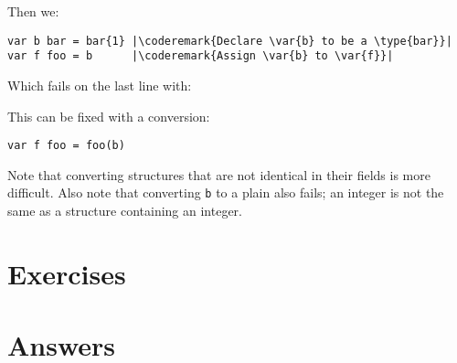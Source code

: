 Then we:
\begin{lstlisting}
var b bar = bar{1} |\coderemark{Declare \var{b} to be a \type{bar}}|
var f foo = b	   |\coderemark{Assign \var{b} to \var{f}}|
\end{lstlisting}
Which fails on the last line with:

\noindent{}

\noindent{}This can be fixed with a conversion:
\begin{lstlisting}
var f foo = foo(b)
\end{lstlisting}
Note that converting structures that are not identical in their fields
is more difficult. Also note that converting \lstinline{b} to a plain
 also fails; an integer is not the same as a structure containing
an integer.

\section{Exercises}












\cleardoublepage
\section{Answers}
\shipoutAnswer

